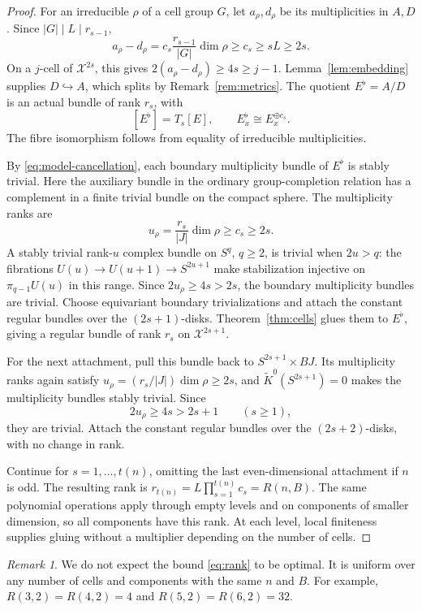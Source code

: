 \documentclass[11pt,a4paper,reqno]{amsart}
\numberwithin{equation}{section}
\theoremstyle{remark}
\newtheorem{remark}[theorem]{Remark}
\theoremstyle{plain}
\newcommand{\X}{\mathcal X}
\begin{document}
\begin{proof}
For an irreducible $\rho$ of a cell group $G$, let $a_\rho,d_\rho$ be its
multiplicities in $A,D$. Since $|G|\mid L\mid r_{s-1}$,
\begin{equation}\label{eq:gaps}
 a_\rho-d_\rho
   =c_s\frac{r_{s-1}}{|G|}\dim\rho
   \geq c_s\geq sL\geq2s.
\end{equation}
On a $j$-cell of $\X^{2s}$, this gives
$2(a_\rho-d_\rho)\geq4s\geq j-1$. Lemma~\ref{lem:embedding} supplies
$D\hookrightarrow A$, which splits by Remark~\ref{rem:metrics}.
The quotient $E^\flat=A/D$ is an actual bundle of rank $r_s$, with
\[
 [E^\flat]=T_s[E],\qquad E^\flat_x\cong E_x^{\oplus c_s}.
\]
The fibre isomorphism follows from equality of irreducible multiplicities.

By \eqref{eq:model-cancellation}, each boundary multiplicity bundle of
$E^\flat$ is stably trivial. Here the auxiliary bundle in the ordinary
group-completion relation has a complement in a finite trivial bundle on
the compact sphere. The multiplicity ranks are
\[
 u_\rho=\frac{r_s}{|J|}\dim\rho\geq c_s\geq2s.
\]
A stably trivial rank-$u$ complex bundle on $S^q$, $q\geq2$, is trivial
when $2u>q$:
the fibrations $U(u)\to U(u+1)\to S^{2u+1}$ make stabilization injective on
$\pi_{q-1}U(u)$ in this range. Since $2u_\rho\geq4s>2s$, the boundary
multiplicity bundles are trivial. Choose equivariant boundary
trivializations and attach the constant regular bundles over the
$(2s+1)$-disks. Theorem~\ref{thm:cells} glues them to $E^\flat$, giving a
regular bundle of rank $r_s$ on $\X^{2s+1}$.

For the next attachment, pull this bundle back to $S^{2s+1}\times BJ$.
Its multiplicity ranks again satisfy $u_\rho=(r_s/|J|)\dim\rho\geq2s$,
and $\widetilde K^0(S^{2s+1})=0$ makes the multiplicity bundles stably
trivial. Since
\[
 2u_\rho\geq4s>2s+1\qquad(s\geq1),
\]
they are trivial. Attach the constant regular bundles over the
$(2s+2)$-disks, with no change in rank.

Continue for $s=1,\ldots,t(n)$, omitting the last even-dimensional
attachment if $n$ is odd. The resulting rank is
$r_{t(n)}=L\prod_{s=1}^{t(n)}c_s=R(n,B)$. The same polynomial operations
apply through empty levels and on components of smaller dimension, so all
components have this rank. At each level, local finiteness supplies
gluing without a multiplier depending on the number of cells.
\end{proof}

\begin{remark}
We do not expect the bound \eqref{eq:rank} to be optimal. It is uniform
over any number of cells and components with the same $n$ and $B$. For example,
$R(3,2)=R(4,2)=4$ and $R(5,2)=R(6,2)=32$.
\end{remark}
\end{document}
